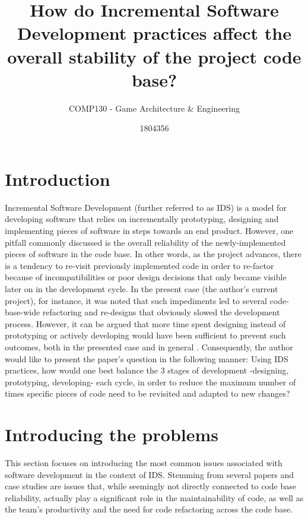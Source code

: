 \documentclass{scrartcl}
\title{How do Incremental Software Development practices affect the overall stability of the project code base?}
\subtitle{COMP130 - Game Architecture \& Engineering}
\author{1804356}
\begin{document}
\maketitle

\begin{abstract}
    
\end{abstract}
    
    \section{Introduction}
    
    Incremental Software Development (further referred to as IDS) is a model for developing software that relies on incrementally prototyping, designing and implementing pieces of software in steps towards an end product. However, one pitfall commonly discussed \cite{Source1, Source2, Source7, Source8} is the overall reliability of the newly-implemented pieces of software in the code base. In other words, as the project advances, there is a tendency to re-visit previously implemented code in order to re-factor because of incompatibilities or poor design decisions that only became visible later on in the development cycle. In the present case (the author's current project), for instance, it was noted that such impediments led to several code-base-wide refactoring and re-designs that obviously slowed the development process. However, it can be argued that more time spent designing instead of prototyping or actively developing would have been sufficient to prevent such outcomes, both in the presented case and in general \cite{Source3, Source5}. Consequently, the author would like to present the paper's question in the following manner: Using IDS practices, how would one best balance the 3 stages of development -designing, prototyping, developing- each cycle, in order to reduce the maximum number of times specific pieces of code need to be revisited and adapted to new changes? 
    
    \section{Introducing the problems}
    
    This section focuses on introducing the most common issues associated with software development in the context of IDS. Stemming from several papers and case studies are issues that, while seemingly not directly connected to code base reliability, actually play a significant role in the maintainability of code, as well as the team's productivity and the need for code refactoring across the code base.
    
\end{document}
